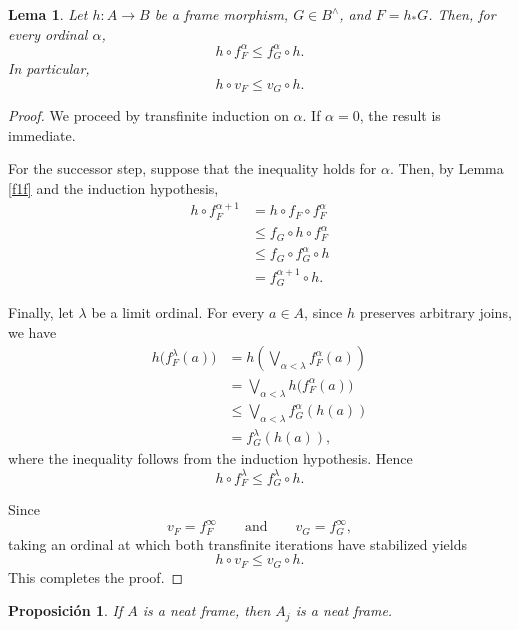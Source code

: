 \documentclass[11pt]{amsart}
\theoremstyle{plain}
\newtheorem{lem}[thm]{Lema}
\newtheorem{prop}[thm]{Proposición}
\theoremstyle{definition}
\begin{document}
\begin{lem}\label{finftyf}
Let \(h\colon A\to B\) be a frame morphism, \(G\in B^\wedge\), and
\(F=h_*G\). Then, for every ordinal \(\alpha\),
\[
    h\circ f_F^\alpha\leq f_G^\alpha\circ h.
\]
In particular,
\[
    h\circ v_F\leq v_G\circ h.
\]
\end{lem}

\begin{proof}
We proceed by transfinite induction on \(\alpha\). If \(\alpha=0\),
the result is immediate.

For the successor step, suppose that the inequality holds for
\(\alpha\). Then, by Lemma \ref{f1f} and the induction hypothesis,
\[
\begin{aligned}
    h\circ f_F^{\alpha+1}
    &=h\circ f_F\circ f_F^\alpha\\
    &\leq f_G\circ h\circ f_F^\alpha\\
    &\leq f_G\circ f_G^\alpha\circ h\\
    &=f_G^{\alpha+1}\circ h.
\end{aligned}
\]

Finally, let \(\lambda\) be a limit ordinal. For every \(a\in A\),
since \(h\) preserves arbitrary joins, we have
\[
\begin{aligned}
    h\bigl(f_F^\lambda(a)\bigr)
    &=
    h\left(\bigvee_{\alpha<\lambda}f_F^\alpha(a)\right)\\
    &=
    \bigvee_{\alpha<\lambda}h\bigl(f_F^\alpha(a)\bigr)\\
    &\leq
    \bigvee_{\alpha<\lambda}f_G^\alpha(h(a))\\
    &=
    f_G^\lambda(h(a)),
\end{aligned}
\]
where the inequality follows from the induction hypothesis. Hence
\[
    h\circ f_F^\lambda\leq f_G^\lambda\circ h.
\]

Since
\[
    v_F=f_F^\infty
    \qquad\text{and}\qquad
    v_G=f_G^\infty,
\]
taking an ordinal at which both transfinite iterations have stabilized
yields
\[
    h\circ v_F\leq v_G\circ h.
\]
This completes the proof.
\end{proof}


\begin{prop}\label{tidyquout}
If \(A\) is a neat frame, then \(A_j\) is a neat frame.
\end{prop}
\end{document}
